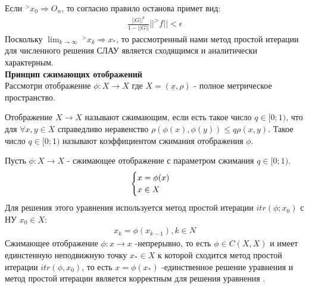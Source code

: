 \documentclass[__main__.tex]{subfiles}
\begin{document}
Если $^>x_0 \Longrightarrow O_n$, то согласно  правило останова примет вид:
\begin{gather}
\frac{||G||^k}{1-||G||}||^>f||<\epsilon
\end{gather}
Поскольку $\lim_{k \to \infty} \ ^>x_k \Longrightarrow x_*$, то рассмотренный нами метод простой итерации для численного решения СЛАУ  является сходящимся и аналитически характерным.\\
\textbf{Принцип сжимающих отображений}\\
Рассмотри отображение $\phi: X \to X$ где $X = (\underline{x},\rho)$ - полное метрическое пространство.\\
\begin{definition}
Отображение $X \to X$ называют сжимающим, если есть такое число $q \in [0;1)$, что для $\forall x,y \in X$ справедливо неравенство $\rho (\phi(x),\phi(y)) \leq q\rho(x,y)$. Такое число $q \in [0;1)$ называют коэффициентом сжимания отображения $\phi$.
\end{definition}
Пусть $\phi: X \to X$ - сжимающее отображение с параметром сжимания $q \in [0;1)$.\\
\begin{gather}
\llabel{12:6}
\begin{cases}
x = \phi(x)\\
x \in X
\end{cases}
\end{gather}
Для решения этого уравнения используется метод простой итерации $itr(\phi;x_0)$ с НУ $x_0 \in X$:
\begin{gather}
x_k = \phi(x_{k-1}),k \in N
\end{gather}
Сжимающее отображение $\phi: x \to x$ -непрерывно, то есть $\phi \in C(X,X)$ и имеет единстенную неподвижную точку $x_* \in X$ к которой сходится метод простой итерации $itr(\phi,x_0)$, то есть $x = \phi(x_*)$ -единственное решение уравнения  и метод простой итерации является корректным для решения уравнения .\\
\end{document}
